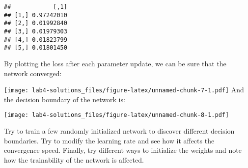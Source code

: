 \documentclass[
  a4paper,
]{article}
\newenvironment{Shaded}{\begin{snugshade}}{\end{snugshade}}
\newcommand{\AttributeTok}[1]{\textcolor[rgb]{0.77,0.63,0.00}{#1}}
\newcommand{\DecValTok}[1]{\textcolor[rgb]{0.00,0.00,0.81}{#1}}
\newcommand{\FloatTok}[1]{\textcolor[rgb]{0.00,0.00,0.81}{#1}}
\newcommand{\FunctionTok}[1]{\textcolor[rgb]{0.00,0.00,0.00}{#1}}
\newcommand{\NormalTok}[1]{#1}
\newcommand{\OtherTok}[1]{\textcolor[rgb]{0.56,0.35,0.01}{#1}}
\newcommand{\SpecialCharTok}[1]{\textcolor[rgb]{0.00,0.00,0.00}{#1}}
\begin{document}
\begin{Shaded}
\end{Shaded}

\begin{verbatim}
##            [,1]
## [1,] 0.97242010
## [2,] 0.01992840
## [3,] 0.01979303
## [4,] 0.01823799
## [5,] 0.01801450
\end{verbatim}

By plotting the loss after each parameter update, we can be sure that
the network converged:

\begin{Shaded}
\end{Shaded}

\texttt{[image: lab4-solutions\_files/figure-latex/unnamed-chunk-7-1.pdf]}
And the decision boundary of the network is:

\begin{Shaded}
\end{Shaded}

\texttt{[image: lab4-solutions\_files/figure-latex/unnamed-chunk-8-1.pdf]}

Try to train a few randomly initialized network to discover different
decision boundaries. Try to modify the learning rate and see how it
affects the convergence speed. Finally, try different ways to initialize
the weights and note how the trainability of the network is affected.
\end{document}
